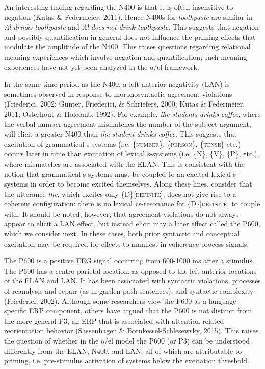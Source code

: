   An interesting finding regarding the N400 is that it is often insensitive to negation (Kutas \& Federmeier, 2011). Hence N400s for \textit{toothpaste} are similar in \textit{Al} \textit{drinks} \textit{toothpaste} and \textit{Al} \textit{does} \textit{not} \textit{drink} \textit{toothpaste}. This suggests that negation and possibly quantification in general does not influence the priming effects that modulate the amplitude of the N400. This raises questions regarding relational meaning experiences which involve negation and quantification; such meaning experiences have not yet been analyzed in the o/el framework.

  In the same time period as the N400, a left anterior negativity (LAN) is sometimes observed in response to morphosyntactic agreement violations (Friederici, 2002; Gunter, Friederici, \& Schriefers, 2000; Kutas \& Federmeier, 2011; Osterhout \& Holcomb, 1992). For example, \textit{the} \textit{students} \textit{drinks} \textit{coffee}, where the verbal number agreement mismatches the number of the subject argument, will elicit a greater N400 than \textit{the} \textit{student} \textit{drinks} \textit{coffee}. This suggests that excitation of grammatical s-systems (i.e. \{\textsc{number}\}, \{\textsc{person}\}, \{\textsc{tense}\} etc.) occurs later in time than excitation of lexical s-systems (i.e. \{N\}, \{V\}, \{P\}, etc.), where mismatches are associated with the ELAN. This is consistent with the notion that grammatical s-systems must be coupled to an excited lexical s-systems in order to become excited themselves. Along these lines, consider that the utterance \textit{the}, which excites only \{D\}[\textsc{definite}], does not give rise to a coherent configuration: there is no lexical cs-resonance for \{D\}[\textsc{definite}] to couple with. It should be noted, however, that agreement violations do not always appear to elicit a LAN effect, but instead elicit may a later effect called the P600, which we consider next. In these cases, both prior syntactic and conceptual excitation may be required for effects to manifest in coherence-process signals.

  The P600 is a positive EEG signal occurring from 600-1000 ms after a stimulus. The P600 has a centro-parietal location, as opposed to the left-anterior locations of the ELAN and LAN. It has been associated with syntactic violations, processes of reanalysis and repair (as in garden-path sentences), and syntactic complexity (Friederici, 2002). Although some researchers view the P600 as a language-specific ERP component, others have argued that the P600 is not distinct from the more general P3, an ERP that is associated with attention-related reorientation behavior (Sassenhagen \& Bornkessel-Schlesewsky, 2015). This raises the question of whether in the o/el model the P600 (or P3) can be understood differently from the ELAN, N400, and LAN, all of which are attributable to priming, i.e. pre-stimulus activation of systems below the excitation threshold.

